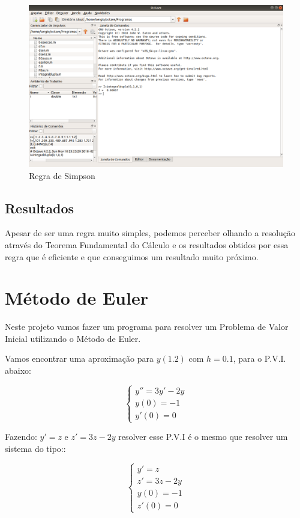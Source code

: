\documentclass[11pt, openright, a4paper, brazil, openany, oneside]{abntex2}
\begin{document}
\begin{figure}[ht]

    \center

    \includegraphics[width=12cm]{octave2.png}
    \caption{Regra de Simpson \label{octave2}}
    
\end{figure}

\section{Resultados}

Apesar de ser uma regra muito simples, podemos perceber olhando a resolução através do Teorema Fundamental do Cálculo e os resultados obtidos por essa regra que é eficiente e que conseguimos um resultado muito próximo.


\chapter{Método de Euler}

Neste projeto vamos fazer um programa para resolver um Problema de Valor Inicial utilizando o Método de Euler.

Vamos encontrar uma aproximação para $y(1.2)$ com $h = 0.1$, para o P.V.I. abaixo:

$$
\left\{\begin{array}{l}
y'' = 3y' - 2y \\ y(0) = -1 \\ y'(0) = 0 
\end{array}\right.
$$

Fazendo: $y'=z$ e $z'=3z - 2y$ resolver esse P.V.I é o mesmo que resolver um sistema do tipo::

$$
\left\{\begin{array}{l}
y'= z \\ z' = 3z-2y \\ y(0) = -1 \\ z'(0) = 0 
\end{array}\right.
$$
\end{document}
